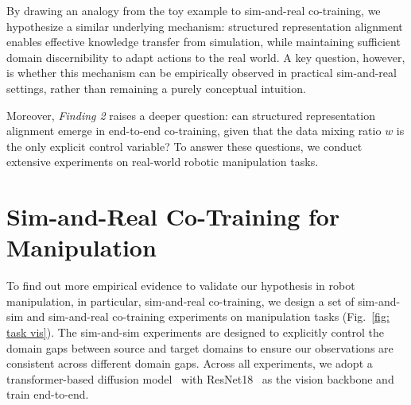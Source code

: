 By drawing an analogy from the toy example to sim-and-real co-training, we hypothesize a similar underlying mechanism: structured representation alignment enables effective knowledge transfer from simulation, while maintaining sufficient domain discernibility to adapt actions to the real world. A key question, however, is whether this mechanism can be empirically observed in practical sim-and-real settings, rather than remaining a purely conceptual intuition.

Moreover, \textit{Finding 2} raises a deeper question: can structured representation alignment emerge in end-to-end co-training, given that the data mixing ratio 
$w$ is the only explicit control variable? To answer these questions, we conduct extensive experiments on real-world robotic manipulation tasks.




\section{Sim-and-Real Co-Training for Manipulation}
\label{sec: manipulation experiments}

To find out more empirical evidence to validate our hypothesis in robot manipulation, in particular, sim-and-real co-training, we design a set of sim-and-sim and sim-and-real co-training experiments on manipulation tasks (Fig.~\ref{fig: task vis}).
The sim-and-sim experiments are designed to explicitly control the domain gaps between source and target domains to ensure our observations are consistent across different domain gaps.
Across all experiments, we adopt a transformer-based diffusion model~\cite{chi2025diffusion} with ResNet18~\cite{he2016deep} as the vision backbone and train end-to-end.






